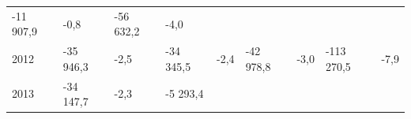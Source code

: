 \begin{longtable}[]{@{}lllllllll@{}}
\begin{minipage}[t]{0.12\columnwidth}
-11 907,9\strut
\end{minipage} & \begin{minipage}[t]{0.06\columnwidth}\raggedright
-0,8\strut
\end{minipage} & \begin{minipage}[t]{0.09\columnwidth}\raggedright
-56 632,2\strut
\end{minipage} & \begin{minipage}[t]{0.06\columnwidth}\raggedright
-4,0\strut
\end{minipage}\tabularnewline
\begin{minipage}[t]{0.05\columnwidth}\raggedright
2012\strut
\end{minipage} & \begin{minipage}[t]{0.10\columnwidth}\raggedright
-35 946,3\strut
\end{minipage} & \begin{minipage}[t]{0.06\columnwidth}\raggedright
-2,5\strut
\end{minipage} & \begin{minipage}[t]{0.16\columnwidth}\raggedright
-34 345,5\strut
\end{minipage} & \begin{minipage}[t]{0.06\columnwidth}\raggedright
-2,4\strut
\end{minipage} & \begin{minipage}[t]{0.12\columnwidth}\raggedright
-42 978,8\strut
\end{minipage} & \begin{minipage}[t]{0.06\columnwidth}\raggedright
-3,0\strut
\end{minipage} & \begin{minipage}[t]{0.09\columnwidth}\raggedright
-113 270,5\strut
\end{minipage} & \begin{minipage}[t]{0.06\columnwidth}\raggedright
-7,9\strut
\end{minipage}\tabularnewline
\begin{minipage}[t]{0.05\columnwidth}\raggedright
2013\strut
\end{minipage} & \begin{minipage}[t]{0.10\columnwidth}\raggedright
-34 147,7\strut
\end{minipage} & \begin{minipage}[t]{0.06\columnwidth}\raggedright
-2,3\strut
\end{minipage} & \begin{minipage}[t]{0.16\columnwidth}\raggedright
-5 293,4\strut

\end{minipage}
\end{longtable}
